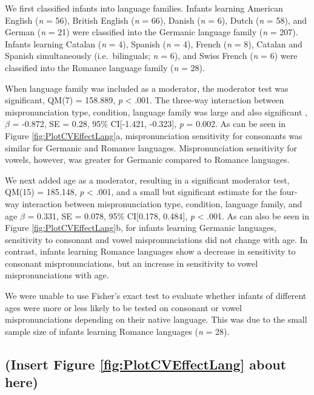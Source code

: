 \documentclass[man]{apa6}
\begin{document}
We first classified infants into language families. Infants learning American English (\emph{n} = 56), British English (\emph{n} = 66), Danish (\emph{n} = 6), Dutch (\emph{n} = 58), and German (\emph{n} = 21) were classified into the Germanic language family (\emph{n} = 207). Infants learning Catalan (\emph{n} = 4), Spanish (\emph{n} = 4), French (\emph{n} = 8), Catalan and Spanish simultaneously (i.e.~bilinguals; \emph{n} = 6), and Swiss French (\emph{n} = 6) were classified into the Romance language family (\emph{n} = 28).

When language family was included as a moderator, the moderator test was significant, QM(7) = 158.889, \emph{p} \textless{} .001. The three-way interaction between mispronunciation type, condition, language family was large and also significant , \(\beta\) = -0.872, SE = 0.28, 95\% CI{[}-1.421, -0.323{]}, \emph{p} = 0.002. As can be seen in Figure \ref{fig:PlotCVEffectLang}a, mispronunciation sensitivity for consonants was similar for Germanic and Romance languages. Mispronunciation sensitivity for vowels, however, was greater for Germanic compared to Romance languages.

We next added age as a moderator, resulting in a significant moderator test, QM(15) = 185.148, \emph{p} \textless{} .001, and a small but significant estimate for the four-way interaction between mispronunciation type, condition, language family, and age \(\beta\) = 0.331, SE = 0.078, 95\% CI{[}0.178, 0.484{]}, \emph{p} \textless{} .001. As can also be seen in Figure \ref{fig:PlotCVEffectLang}b, for infants learning Germanic languages, sensitivity to consonant and vowel mispronunciations did not change with age. In contrast, infants learning Romance languages show a decrease in sensitivity to consonant mispronunciations, but an increase in sensitivity to vowel mispronunciations with age.

We were unable to use Fisher's exact test to evaluate whether infants of different ages were more or less likely to be tested on consonant or vowel mispronunciations depending on their native language. This was due to the small sample size of infants learning Romance languages (\emph{n} = 28).

\hypertarget{insert-figure-reffigplotcveffectlang-about-here}{%
\subsection{(Insert Figure \ref{fig:PlotCVEffectLang} about here)}\label{insert-figure-reffigplotcveffectlang-about-here}}
\end{document}

